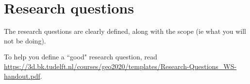 \section{Research questions}
The research questions are clearly defined, along with the scope (ie what you will not be doing).

To help you define a ``good" research question, read \url{https://3d.bk.tudelft.nl/courses/geo2020/templates/Research-Questions_WS-handout.pdf}.

